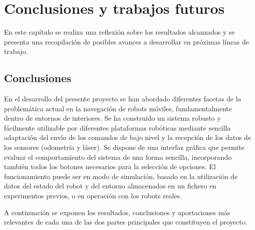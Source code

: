 
\chapter{Conclusiones y trabajos futuros}

En este capítulo se realiza una reflexión sobre los resultados alcanzados y se presenta una recopilación de posibles avances a desarrollar en próximas líneas de trabajo.

\section{Conclusiones}

En el desarrollo del presente proyecto se han abordado diferentes facetas de la problemática actual en la navegación de robots móviles, fundamentalmente dentro de entornos de interiores. Se ha construido un sistema robusto y fácilmente utilizable por diferentes plataformas robóticas mediante sencilla adaptación del envío de los comandos de bajo nivel y la recepción de los datos de los sensores (odometría y láser). Se dispone de una interfaz gráfica que permite evaluar el comportamiento del sistema de una forma sencilla, incorporando también todos los botones necesarios para la selección de opciones. El funcionamiento puede ser en modo de simulación, basado en la utilización de datos del estado del robot y del entorno almacenados en un fichero en experimentos previos, o en operación con los robots reales.

A continuación se exponen los resultados, conclusiones y aportaciones más relevantes de cada una de las dos partes principales que constituyen el proyecto.

